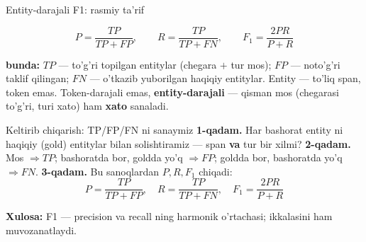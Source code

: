 \documentclass[aspectratio=169,11pt]{beamer}
\newcommand{\bunda}[1]{{\small\textbf{bunda:}\; #1}}
\begin{document}
\begin{frame}{Entity-darajali F1: rasmiy ta'rif}
  \begin{tcolorbox}[defbox,title={Ta'rif: entity-darajali precision, recall, F1}]
    \vspace{-0.4em}
    $$ P = \frac{TP}{TP+FP}, \qquad R = \frac{TP}{TP+FN}, \qquad
       F_1 = \frac{2PR}{P+R} $$
  \end{tcolorbox}
  \vspace{2pt}
  \bunda{$TP$ --- to'g'ri topilgan entitylar (chegara $+$ tur mos); $FP$ ---
  noto'g'ri taklif qilingan; $FN$ --- o'tkazib yuborilgan haqiqiy entitylar.
  Entity --- to'liq span, token emas.}
  \vspace{4pt}
  \footnotesize Token-darajali emas, \textbf{entity-darajali} --- qisman mos
  (chegarasi to'g'ri, turi xato) ham \textbf{xato} sanaladi.
\end{frame}

\begin{frame}{Keltirib chiqarish: TP/FP/FN ni sanaymiz}
  \textbf{1-qadam.} Har bashorat entity ni haqiqiy (gold) entitylar bilan
  solishtiramiz --- span \textbf{va} tur bir xilmi?
  \pause
  \textbf{2-qadam.} Mos $\Rightarrow TP$; bashoratda bor, goldda yo'q $\Rightarrow FP$;
  goldda bor, bashoratda yo'q $\Rightarrow FN$.
  \pause
  \textbf{3-qadam.} Bu sanoqlardan $P,R,F_1$ chiqadi:
  $$ P=\frac{TP}{TP{+}FP}, \quad R=\frac{TP}{TP{+}FN}, \quad F_1=\frac{2PR}{P{+}R} $$
  \begin{tcolorbox}[okbox,top=2pt,bottom=2pt]
    \small \textbf{Xulosa:} F1 --- precision va recall ning harmonik o'rtachasi;
    ikkalasini ham muvozanatlaydi.
  \end{tcolorbox}
\end{frame}
\end{document}
